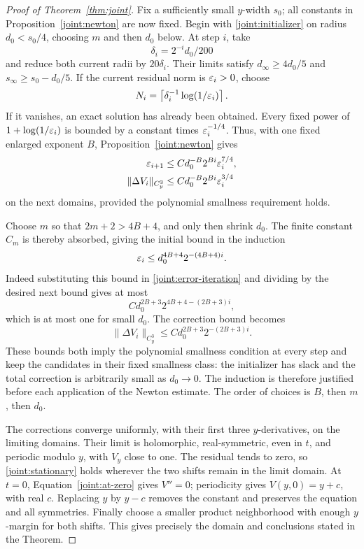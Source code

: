 \begin{proof}[Proof of Theorem~\ref{thm:joint}]
Fix a sufficiently small \(y\)-width \(s_0\); all constants in
Proposition~\ref{joint:newton} are now fixed.  Begin with
\eqref{joint:initializer} on radius \(d_0<s_0/4\), choosing \(m\)
and then \(d_0\) below.  At step \(i\), take
\[
 \delta_i=2^{-i}d_0/200
\]
and reduce both current radii by \(20\delta_i\).  Their limits satisfy
\(d_\infty\ge4d_0/5\) and \(s_\infty\ge s_0-d_0/5\).
If the current residual norm is \(\varepsilon_i>0\), choose
\[
 N_i=\left\lceil\delta_i^{-1}\log(1/\varepsilon_i)\right\rceil.
\]
If it vanishes, an exact solution has already been obtained.  Every
fixed power of \(1+\log(1/\varepsilon_i)\) is bounded by a constant times
\(\varepsilon_i^{-1/4}\).  Thus, with one fixed enlarged exponent \(B\),
Proposition~\ref{joint:newton} gives
\begin{align}
 \varepsilon_{i+1}&\le C d_0^{-B}2^{Bi}\varepsilon_i^{7/4},
 \label{joint:error-iteration}\\
 \|\Delta V_i\|_{C_y^3}
   &\le C d_0^{-B}2^{Bi}\varepsilon_i^{3/4}
 \label{joint:correction-iteration}
\end{align}
on the next domains, provided the polynomial smallness requirement holds.

Choose \(m\) so that \(2m+2>4B+4\), and only then shrink \(d_0\).
The finite constant \(C_m\) is thereby absorbed, giving the initial
bound in the induction
\begin{equation}
 \varepsilon_i\le d_0^{4B+4}2^{-(4B+4)i}.
 \label{joint:majorant}
\end{equation}
Indeed substituting this bound in \eqref{joint:error-iteration} and
dividing by the desired next bound gives at most
\[
 C d_0^{2B+3}2^{4B+4-(2B+3)i},
\]
which is at most one for small \(d_0\).  The correction bound becomes
\[
 \|\Delta V_i\|_{C_y^3}
 \le C d_0^{2B+3}2^{-(2B+3)i}.
\]
These bounds both imply the polynomial smallness condition at every
step and keep the candidates in their fixed smallness class: the
initializer has slack and the total correction is arbitrarily small
as \(d_0\to0\).  The induction is therefore justified before each
application of the Newton estimate.  The order of choices is
\(B\), then \(m\), then \(d_0\).

The corrections converge uniformly, with their first three
\(y\)-derivatives, on the limiting domains.  Their limit is
holomorphic, real-symmetric, even in \(t\), and periodic modulo \(y\),
with \(V_y\) close to one.  The residual tends to zero, so
\eqref{joint:stationary} holds wherever the two shifts remain in the
limit domain.  At \(t=0\), Equation~\eqref{joint:at-zero} gives
\(V''=0\); periodicity gives \(V(y,0)=y+c\), with real \(c\).
Replacing \(y\) by \(y-c\) removes the constant and preserves the
equation and all symmetries.  Finally choose a smaller product
neighborhood with enough \(y\)-margin for both shifts.  This gives
precisely the domain and conclusions stated in the Theorem.
\end{proof}
